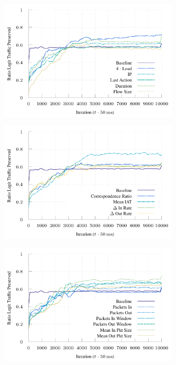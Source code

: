 \documentclass[conference, letterpaper, 10pt, times]{IEEEtran}
\begin{document}
\begin{figure}
	\centering
	\begin{subfigure}{0.32\linewidth}
		\includegraphics[width=\linewidth]{../plots/ftprep-good}
	\end{subfigure}
	\begin{subfigure}{0.32\linewidth}
		\includegraphics[width=\linewidth]{../plots/ftprep-good-2}
	\end{subfigure}
	\begin{subfigure}{0.32\linewidth}
		\includegraphics[width=\linewidth]{../plots/ftprep-good-3}

\end{subfigure}
\end{figure}
\end{document}
